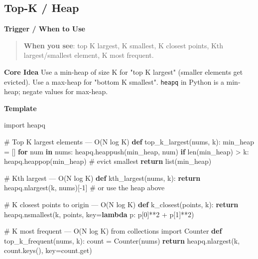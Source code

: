 \documentclass[11pt]{article}
\newenvironment{Shaded}{\begin{snugshade}}{\end{snugshade}}
\newcommand{\BuiltInTok}[1]{\textcolor[rgb]{0.50,0.55,0.55}{#1}}
\newcommand{\CommentTok}[1]{\textcolor[rgb]{0.48,0.49,0.49}{#1}}
\newcommand{\ControlFlowTok}[1]{\textcolor[rgb]{0.99,0.74,0.29}{\textbf{#1}}}
\newcommand{\DecValTok}[1]{\textcolor[rgb]{0.96,0.45,0.00}{#1}}
\newcommand{\ImportTok}[1]{\textcolor[rgb]{0.15,0.68,0.38}{#1}}
\newcommand{\KeywordTok}[1]{\textcolor[rgb]{0.81,0.81,0.76}{\textbf{#1}}}
\newcommand{\NormalTok}[1]{\textcolor[rgb]{0.81,0.81,0.76}{#1}}
\newcommand{\OperatorTok}[1]{\textcolor[rgb]{0.81,0.81,0.76}{#1}}
\begin{document}
\subsection{Top-K / Heap}\label{top-k--heap}

\textbf{Trigger / When to Use}

\begin{quote}
\textbf{When you see}: top K largest, K smallest, K closest points, Kth largest/smallest element, K most frequent.
\end{quote}

\textbf{Core Idea}
Use a min-heap of size K for "top K largest" (smaller elements get evicted). Use a max-heap for "bottom K smallest". \texttt{heapq} in Python is a min-heap; negate values for max-heap.

\textbf{Template}


\begin{Shaded}
\begin{Highlighting}[]
\ImportTok{import}\NormalTok{ heapq}

\CommentTok{\# Top K largest elements — O(N log K)}
\KeywordTok{def}\NormalTok{ top\_k\_largest(nums, k):}
\NormalTok{    min\_heap }\OperatorTok{=}\NormalTok{ []}
    \ControlFlowTok{for}\NormalTok{ num }\KeywordTok{in}\NormalTok{ nums:}
\NormalTok{        heapq.heappush(min\_heap, num)}
        \ControlFlowTok{if} \BuiltInTok{len}\NormalTok{(min\_heap) }\OperatorTok{\textgreater{}}\NormalTok{ k:}
\NormalTok{            heapq.heappop(min\_heap)      }\CommentTok{\# evict smallest}
    \ControlFlowTok{return} \BuiltInTok{list}\NormalTok{(min\_heap)}

\CommentTok{\# Kth largest — O(N log K)}
\KeywordTok{def}\NormalTok{ kth\_largest(nums, k):}
    \ControlFlowTok{return}\NormalTok{ heapq.nlargest(k, nums)[}\OperatorTok{{-}}\DecValTok{1}\NormalTok{]  }\CommentTok{\# or use the heap above}

\CommentTok{\# K closest points to origin — O(N log K)}
\KeywordTok{def}\NormalTok{ k\_closest(points, k):}
    \ControlFlowTok{return}\NormalTok{ heapq.nsmallest(k, points, key}\OperatorTok{=}\KeywordTok{lambda}\NormalTok{ p: p[}\DecValTok{0}\NormalTok{]}\OperatorTok{**}\DecValTok{2} \OperatorTok{+}\NormalTok{ p[}\DecValTok{1}\NormalTok{]}\OperatorTok{**}\DecValTok{2}\NormalTok{)}

\CommentTok{\# K most frequent — O(N log K)}
\ImportTok{from}\NormalTok{ collections }\ImportTok{import}\NormalTok{ Counter}
\KeywordTok{def}\NormalTok{ top\_k\_frequent(nums, k):}
\NormalTok{    count }\OperatorTok{=}\NormalTok{ Counter(nums)}
    \ControlFlowTok{return}\NormalTok{ heapq.nlargest(k, count.keys(), key}\OperatorTok{=}\NormalTok{count.get)}
\end{Highlighting}
\end{Shaded}
\end{document}
